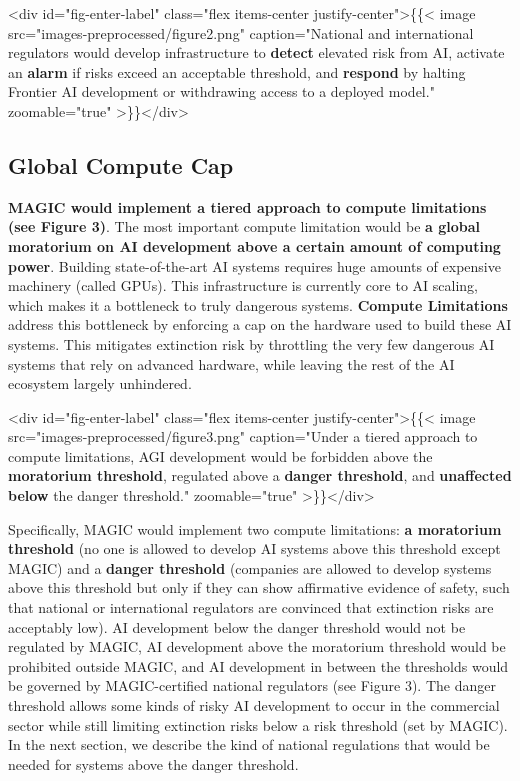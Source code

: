 \documentclass[12pt,a4paper]{article}
\begin{document}
<div id="fig-enter-label" class="flex items-center justify-center">\{\{< image src="images-preprocessed/figure2.png" caption="National and international regulators would develop infrastructure to \textbf{detect} elevated risk from AI, activate an \textbf{alarm} if risks exceed an acceptable threshold, and \textbf{respond} by halting Frontier AI development or withdrawing access to a deployed model." zoomable="true" >\}\}</div>



\subsection{Global Compute Cap}

\textbf{MAGIC would implement a tiered approach to compute limitations (see Figure 3)}. The most important compute limitation would be \textbf{a global moratorium on AI development above a certain amount of computing power}. Building state-of-the-art AI systems requires huge amounts of expensive machinery (called GPUs). This infrastructure is currently core to AI scaling, which makes it a bottleneck to truly dangerous systems. \textbf{Compute Limitations} address this bottleneck by enforcing a cap on the hardware used to build these AI systems. This mitigates extinction risk by throttling the very few dangerous AI systems that rely on advanced hardware, while leaving the rest of the AI ecosystem largely unhindered.

<div id="fig-enter-label" class="flex items-center justify-center">\{\{< image src="images-preprocessed/figure3.png" caption="Under a tiered approach to compute limitations, AGI development would be forbidden above the \textbf{moratorium threshold}, regulated above a \textbf{danger threshold}, and \textbf{unaffected below} the danger threshold." zoomable="true" >\}\}</div>



Specifically, MAGIC would implement two compute limitations: \textbf{a moratorium threshold} (no one is allowed to develop AI systems above this threshold except MAGIC) and a \textbf{danger threshold} (companies are allowed to develop systems above this threshold but only if they can show affirmative evidence of safety, such that national or international regulators are convinced that extinction risks are acceptably low). AI development below the danger threshold would not be regulated by MAGIC, AI development above the moratorium threshold would be prohibited outside MAGIC, and AI development in between the thresholds would be governed by MAGIC-certified national regulators (see Figure 3). The danger threshold allows some kinds of risky AI development to occur in the commercial sector while still limiting extinction risks below a risk threshold (set by MAGIC). In the next section, we describe the kind of national regulations that would be needed for systems above the danger threshold.
\end{document}
